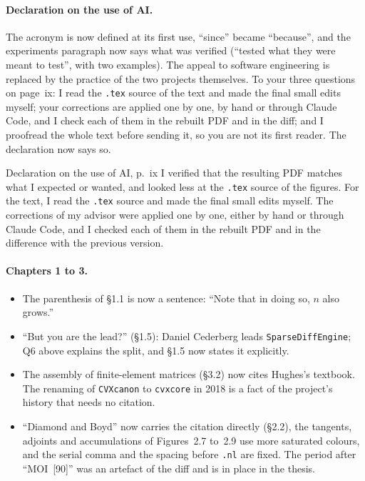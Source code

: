 \documentclass[letterpaper,12pt]{article}
\begin{document}
\paragraph{Declaration on the use of AI.}
The acronym is now defined at its first use, ``since'' became ``because'', and the experiments
paragraph now says what was verified (``tested what they were meant to test'', with two
examples). The appeal to software engineering is replaced by the practice of the two projects
themselves. To your three questions on page~ix: I read the \texttt{.tex} source of the text and
made the final small edits myself; your corrections are applied one by one, by hand or through
Claude Code, and I check each of them in the rebuilt PDF and in the diff; and I proofread the
whole text before sending it, so you are not its first reader. The declaration now says so.
\begin{thesisquote}{Declaration on the use of AI, p.~ix}
I verified that the resulting PDF matches what I expected or wanted, and looked less at the
\texttt{.tex} source of the figures. For the text, I read the \texttt{.tex} source and made the
final small edits myself. The corrections of my advisor were applied one by one, either by
hand or through Claude Code, and I checked each of them in the rebuilt PDF and in the
difference with the previous version.
\end{thesisquote}

\paragraph{Chapters 1 to 3.}
\begin{itemize}[leftmargin=*]
\item The parenthesis of \S1.1 is now a sentence: ``Note that in doing so, $n$ also grows.''
\item ``But you are the lead?'' (\S1.5): Daniel Cederberg leads \texttt{SparseDiffEngine}; Q6
  above explains the split, and \S1.5 now states it explicitly.
\item The assembly of finite-element matrices (\S3.2) now cites Hughes's textbook. The
  renaming of \texttt{CVXcanon} to \texttt{cvxcore} in 2018 is a fact of the project's history
  that needs no citation.
\item ``Diamond and Boyd'' now carries the citation directly (\S2.2), the tangents, adjoints and
  accumulations of Figures~2.7 to~2.9 use more saturated colours, and the serial comma and the
  spacing before \texttt{.nl} are fixed. The period after ``MOI~[90]'' was an artefact of the
  diff and is in place in the thesis.
\end{itemize}
\end{document}
